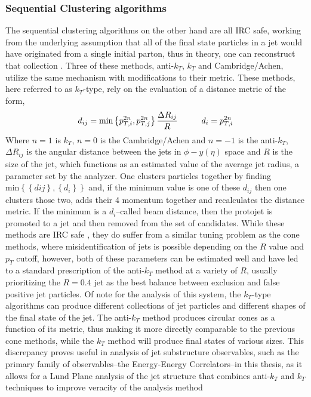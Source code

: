 	\subsubsection{Sequential Clustering algorithms}
	The sequential clustering algorithms on the other hand are all IRC safe, working from the underlying assumption that all of the final state particles in a jet would have originated from a single initial parton, thus in theory, one can reconstruct that collection \cite{Dokshitzer1997}.
	Three of these methods, anti-$k_{T}$, $k_{T}$ and Cambridge/Achen, utilize the same mechanism with modifications to their metric. 
	These methods, here referred to as $k_{T}$-type, rely on the evaluation of a distance metric of the form, 	\begin{equation}
		d_{ij} = \textrm{min}\left\{ p_{T, i}^{2n}, p_{T, j}^{2n} \right\} \frac{\Delta R_{ij}}{R} \hspace{1 cm} d_{i} = p_{T, i}^{2n} 
	\end{equation}
	Where $n=1$ is $k_{T}$, $n=0$ is the Cambridge/Achen and $n=-1$ is the anti-$k_{T}$, $\Delta R_{ij}$ is the angular distance between the jets in $\phi-y (\eta)$ space and $R$ is the size of the jet, which functions as an estimated value of the average jet radius, a parameter set by the analyzer.
	One clusters particles together by finding $\textrm{min}\left\{ \left\{ d{ij} \right\}, \left\{ d_{i} \right\} \right\}$ and, if the minimum value is one of these $d_{ij}$ then one clusters those two, adds their 4 momentum together and recalculates the distance metric. 
	If the minimum is a $d_{i}$--called beam distance, then the protojet is promoted to a jet and then removed from the set of candidates. 
	While these methods are IRC safe \cite{Dokshitzer1997}, they do suffer from a similar tuning problem as the cone methods, where misidentification of jets is possible depending on the $R$ value and $p_{T}$ cutoff, however, both of these parameters can be estimated well and have led to a standard prescription of the anti-$k_{T}$ method at a variety of $R$, usually prioritizing the $R=0.4$ jet as the best balance between exclusion and false positive jet particles. %
	Of note for the analysis of this system, the $k_{T}$-type algorithms can produce different collections of jet particles and different shapes of the final state of the jet. 
	The anti-$k_{T}$ method produces circular cones as a function of its metric, thus making it more directly comparable to the previous cone methods, while the $k_{T}$ method will produce final states of various sizes.
	This discrepancy proves useful in analysis of jet substructure observables, such as the primary family of observables--the Energy-Energy Correlators--in this thesis, as it allows for a Lund Plane analysis of the jet structure that combines anti-$k_T$ and $k_{T}$ techniques to improve veracity of the analysis method %


